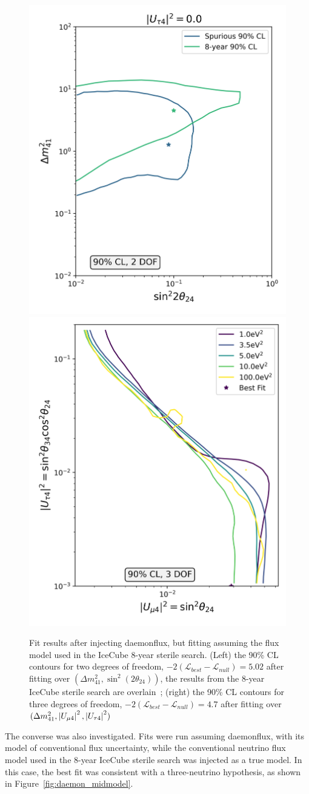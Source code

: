 \documentclass[main.tex]{subfiles}
\begin{document}
\begin{figure}  
    \centering
    \includegraphics[width=0.45\linewidth]{figures/track_daemon_mismodel_Realization_daemon_Asimov_sterile_0_cl0.9_dof2.png}
    \includegraphics[width=0.45\linewidth]{figures/track_daemon_mismodel_nomeow_Realization_daemon_Asimov_sterile_0_cl0.9_dof3.png}
    \caption{Fit results after injecting daemonflux, but fitting assuming the flux model used in the IceCube 8-year sterile search. (Left) the 90\% CL contours for two degrees of freedom, $-2(\mathcal{L}_{best}-\mathcal{L}_{null})=5.02$ after fitting over $(\Delta m_{41}^{2}, \sin^{2}(2\theta_{24}))$, the results from the 8-year IceCube sterile search are overlain~\cite{Aartsen_2020, Aartsen_2020_prd}; (right) the 90\% CL contours for three degrees of freedom, $-2(\mathcal{L}_{best}-\mathcal{L}_{null})=4.7$ after fitting over $(\Delta m_{41}^{2}, \left| U_{\mu4} \right|^{2}, \left| U_{\tau 4} \right|^{2})$}\label{fig:uhoh_mismodel_worse}
\end{figure}

The converse was also investigated.
Fits were run assuming daemonflux, with its model of conventional flux uncertainty, while the conventional neutrino flux model used in the 8-year IceCube sterile search was injected as a true model. 
In this case, the best fit was consistent with a three-neutrino hypothesis, as shown in Figure~\ref{fig:daemon_midmodel}.
\end{document}
